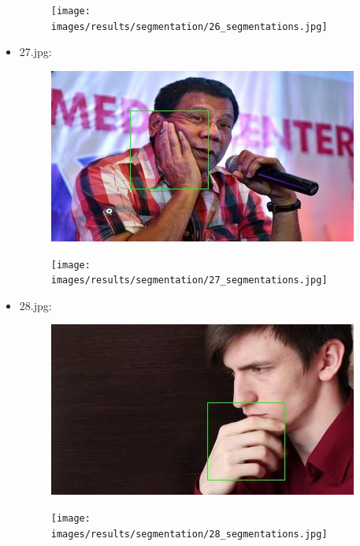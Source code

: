 \begin{itemize}
\begin{figure}[!htb]
\begin{minipage}{0.5\textwidth}
                \texttt{[image: images/results/segmentation/26\_segmentations.jpg]}
            \end{minipage}
        \end{figure}
    \newpage
    \item 27.jpg:
       \begin{figure}[!htb]
            \begin{minipage}{0.5\textwidth}
                \centering
                \includegraphics[scale = 0.68]{images/results/detection/27_detections.jpg}
            \end{minipage}\hfill
            \begin{minipage}{0.5\textwidth}
                \centering
                \texttt{[image: images/results/segmentation/27\_segmentations.jpg]}
            \end{minipage}
        \end{figure}
    \item 28.jpg:
        \begin{figure}[!htb]
            \begin{minipage}{0.5\textwidth}
                \centering
                \includegraphics[scale = 0.68]{images/results/detection/28_detections.jpg}
            \end{minipage}\hfill
            \begin{minipage}{0.5\textwidth}
                \centering
                \texttt{[image: images/results/segmentation/28\_segmentations.jpg]}

\end{minipage}
\end{figure}
\end{itemize}
